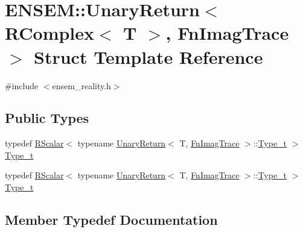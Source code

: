 \hypertarget{structENSEM_1_1UnaryReturn_3_01RComplex_3_01T_01_4_00_01FnImagTrace_01_4}{}\section{E\+N\+S\+EM\+:\+:Unary\+Return$<$ R\+Complex$<$ T $>$, Fn\+Imag\+Trace $>$ Struct Template Reference}
\label{structENSEM_1_1UnaryReturn_3_01RComplex_3_01T_01_4_00_01FnImagTrace_01_4}


{\ttfamily \#include $<$ensem\+\_\+reality.\+h$>$}

\subsection*{Public Types}
\begin{DoxyCompactItemize}
\item 
typedef \mbox{\hyperlink{classENSEM_1_1RScalar}{R\+Scalar}}$<$ typename \mbox{\hyperlink{structENSEM_1_1UnaryReturn}{Unary\+Return}}$<$ T, \mbox{\hyperlink{structENSEM_1_1FnImagTrace}{Fn\+Imag\+Trace}} $>$\+::\mbox{\hyperlink{structENSEM_1_1UnaryReturn_3_01RComplex_3_01T_01_4_00_01FnImagTrace_01_4_a0a6fd745f329be78992f62eebd7ef256}{Type\+\_\+t}} $>$ \mbox{\hyperlink{structENSEM_1_1UnaryReturn_3_01RComplex_3_01T_01_4_00_01FnImagTrace_01_4_a0a6fd745f329be78992f62eebd7ef256}{Type\+\_\+t}}
\item 
typedef \mbox{\hyperlink{classENSEM_1_1RScalar}{R\+Scalar}}$<$ typename \mbox{\hyperlink{structENSEM_1_1UnaryReturn}{Unary\+Return}}$<$ T, \mbox{\hyperlink{structENSEM_1_1FnImagTrace}{Fn\+Imag\+Trace}} $>$\+::\mbox{\hyperlink{structENSEM_1_1UnaryReturn_3_01RComplex_3_01T_01_4_00_01FnImagTrace_01_4_a0a6fd745f329be78992f62eebd7ef256}{Type\+\_\+t}} $>$ \mbox{\hyperlink{structENSEM_1_1UnaryReturn_3_01RComplex_3_01T_01_4_00_01FnImagTrace_01_4_a0a6fd745f329be78992f62eebd7ef256}{Type\+\_\+t}}
\end{DoxyCompactItemize}


\subsection{Member Typedef Documentation}
\mbox{\label{structENSEM_1_1UnaryReturn_3_01RComplex_3_01T_01_4_00_01FnImagTrace_01_4_a0a6fd745f329be78992f62eebd7ef256}} 
